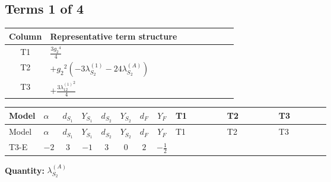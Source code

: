 \documentclass[8pt]{article}
\begin{document}
\begin{landscape}
\subsection*{Terms 1 of 4}
\begin{center}
\begin{tabular}{@{}c >{\raggedright\arraybackslash}p{0.82\linewidth}@{}}
\toprule
Column & Representative term structure \\
\midrule
T1 & \(\displaystyle \frac{3 {g_2}^4}{4}\) \\
\midrule
T2 & \(\displaystyle +{g_2}^2 (-3 {\lambda_{S_2}^{(1)}}-24 {\lambda_{S_2}^{(A)}})\) \\
\midrule
T3 & \(\displaystyle +\frac{3 {\lambda_{12}^{(1)}}^2}{4}\) \\
\midrule
\bottomrule
\end{tabular}
\end{center}
\smallskip
\tiny
\begin{longtable}{@{}llcccccc >{\raggedright\arraybackslash}p{0.21\linewidth} >{\raggedright\arraybackslash}p{0.21\linewidth} >{\raggedright\arraybackslash}p{0.21\linewidth}@{}}
\toprule
Model & $\alpha$ & $d_{S_1}$ & $Y_{S_1}$ & $d_{S_2}$ & $Y_{S_2}$ & $d_F$ & $Y_F$ & T1 & T2 & T3 \\
\midrule
\endfirsthead
\toprule
Model & $\alpha$ & $d_{S_1}$ & $Y_{S_1}$ & $d_{S_2}$ & $Y_{S_2}$ & $d_F$ & $Y_F$ & T1 & T2 & T3 \\
\midrule
\endhead
T3-E & $-2$ & $3$ & $-1$ & $3$ & $0$ & $2$ & $-\frac{1}{2}$ & \scriptsize\adjustbox{max width=\linewidth}{$\begin{gathered} \frac{3 {g_2}^4}{4}\end{gathered}$} & \scriptsize\adjustbox{max width=\linewidth}{$\begin{gathered} +{g_2}^2 (-3 {\lambda_{S_2}^{(1)}}-24 {\lambda_{S_2}^{(A)}})\end{gathered}$} & \scriptsize\adjustbox{max width=\linewidth}{$\begin{gathered} +\frac{3 {\lambda_{12}^{(1)}}^2}{4}\end{gathered}$} \\
\midrule
\bottomrule
\end{longtable}
\clearpage
\noindent\textbf{Quantity: }$\lambda_{S_2}^{(A)}$\par\smallskip

\end{landscape}
\end{document}

